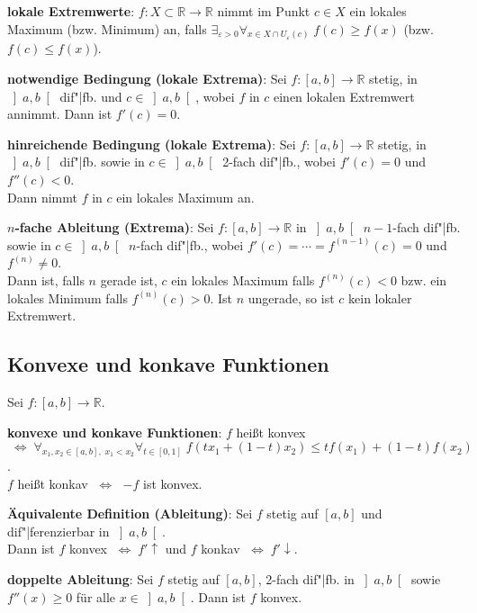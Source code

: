 \textbf{lokale Extremwerte}:
$f: X \subset \mathbb{R} \rightarrow \mathbb{R}$ nimmt im Punkt $c \in X$
ein lokales Maximum (bzw. Minimum) an, falls
$\exists_{\varepsilon > 0} \forall_{x \in X \cap U_\varepsilon(c)}\;
f(c) \ge f(x)$ (bzw. $f(c) \le f(x)$).

\textbf{notwendige Bedingung (lokale Extrema)}:
Sei $f: [a,b] \rightarrow \mathbb{R}$ stetig, in $\left]a,b\right[$ dif"|fb.
und $c \in \left]a,b\right[$, wobei $f$ in $c$ einen lokalen Extremwert
annimmt. \qquad
Dann ist $f'(c) = 0$.

\textbf{hinreichende Bedingung (lokale Extrema)}:
Sei $f: [a,b] \rightarrow \mathbb{R}$ stetig, in $\left]a,b\right[$ dif"|fb.
sowie in $c \in \left]a,b\right[$ 2-fach dif"|fb., wobei
$f'(c) = 0$ und $f''(c) < 0$. \\
Dann nimmt $f$ in $c$ ein lokales Maximum an.

\textbf{$n$-fache Ableitung (Extrema)}:
Sei $f: [a,b] \rightarrow \mathbb{R}$ in $\left]a,b\right[$ $n-1$-fach dif"|fb.
sowie in $c \in \left]a,b\right[$ $n$-fach dif"|fb., wobei
$f'(c) = \cdots = f^{(n-1)}(c) = 0$ und $f^{(n)} \not= 0$. \\
Dann ist, falls $n$ gerade ist, $c$ ein lokales Maximum falls $f^{(n)}(c) < 0$
bzw. ein lokales Minimum falls $f^{(n)}(c) > 0$. \qquad
Ist $n$ ungerade, so ist $c$ kein lokaler Extremwert.

\subsection{%
    Konvexe und konkave Funktionen%
}

Sei $f: [a,b] \rightarrow \mathbb{R}$.

\textbf{konvexe und konkave Funktionen}:
$f$ heißt konvex \\
$\;\Leftrightarrow\; \forall_{x_1, x_2 \in [a,b],\; x_1 < x_2}
\forall_{t \in [0,1]}\; f(tx_1 + (1 - t)x_2) \le t f(x_1) + (1 - t) f(x_2)$. \\
$f$ heißt konkav $\;\Leftrightarrow\;$ $-f$ ist konvex.

\textbf{Äquivalente Definition (Ableitung)}:
Sei $f$ stetig auf $[a,b]$ und dif"|ferenzierbar in $\left]a,b\right[$. \\
Dann ist $f$ konvex $\;\Leftrightarrow\; f'\!\!\uparrow$ \qquad und \qquad
$f$ konkav $\;\Leftrightarrow\; f'\!\!\downarrow$.

\textbf{doppelte Ableitung}:
Sei $f$ stetig auf $[a,b]$, 2-fach dif"|fb. in $\left]a,b\right[$ sowie
$f''(x) \ge 0$ für alle $x \in \left]a,b\right[$. \qquad
Dann ist $f$ konvex.

